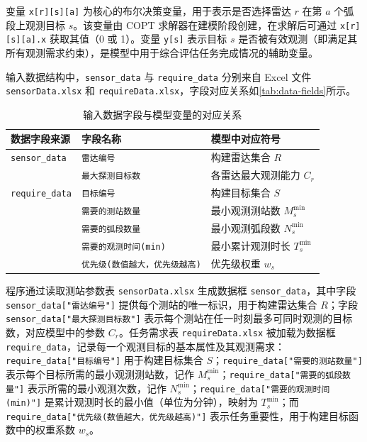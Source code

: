 \documentclass[openany,12pt,UTF8]{ctexart}
\begin{document}
变量 \texttt{x[r][s][a]} 为核心的布尔决策变量，用于表示是否选择雷达 $r$ 在第 $a$ 个弧段上观测目标 $s$。该变量由 COPT 求解器在建模阶段创建，在求解后可通过 \texttt{x[r][s][a].x} 获取其值（0 或 1）。变量 \texttt{y[s]} 表示目标 $s$ 是否被有效观测（即满足其所有观测需求约束），是模型中用于综合评估任务完成情况的辅助变量。

输入数据结构中，\texttt{sensor\_data} 与 \texttt{require\_data} 分别来自 Excel 文件 \texttt{sensorData.xlsx} 和 \texttt{requireData.xlsx}，字段对应关系如\autoref{tab:data-fields}所示。
\begin{table}[H]
    \centering
    \caption{输入数据字段与模型变量的对应关系}
    \label{tab:data-fields}
    \begin{tabular}{lll}
        \toprule
        \textbf{数据字段来源}        & \textbf{字段名称}            & \textbf{模型中对应符号}      \\
        \midrule
        \texttt{sensor\_data}  & \texttt{雷达编号}            & 构建雷达集合 $R$            \\
                               & \texttt{最大探测目标数}         & 各雷达最大观测能力 $C_r$       \\
        \addlinespace
        \texttt{require\_data} & \texttt{目标编号}            & 构建目标集合 $S$            \\
                               & \texttt{需要的测站数量}         & 最小观测测站数 $M_s^{\min}$  \\
                               & \texttt{需要的弧段数量}         & 最小观测弧段数 $N_s^{\min}$  \\
                               & \texttt{需要的观测时间(min)}    & 最小累计观测时长 $T_s^{\min}$ \\
                               & \texttt{优先级(数值越大，优先级越高)} & 优先级权重 $w_s$           \\
        \bottomrule
    \end{tabular}
\end{table}

程序通过读取测站参数表 \texttt{sensorData.xlsx} 生成数据框 \texttt{sensor\_data}，其中字段 \texttt{sensor\_data["雷达编号"]} 提供每个测站的唯一标识，用于构建雷达集合 $R$；字段 \texttt{sensor\_data["最大探测目标数"]} 表示每个测站在任一时刻最多可同时观测的目标数，对应模型中的参数 $C_r$。任务需求表 \texttt{requireData.xlsx} 被加载为数据框 \texttt{require\_data}，记录每一个观测目标的基本属性及其观测需求：\texttt{require\_data["目标编号"]} 用于构建目标集合 $S$；\texttt{require\_data["需要的测站数量"]} 表示每个目标所需的最小观测测站数，记作 $M_s^{\min}$；\texttt{require\_data["需要的弧段数量"]} 表示所需的最小观测次数，记作 $N_s^{\min}$；\texttt{require\_data["需要的观测时间(min)"]} 是累计观测时长的最小值（单位为分钟），映射为 $T_s^{\min}$；而 \texttt{require\_data["优先级(数值越大，优先级越高)"]} 表示任务重要性，用于构建目标函数中的权重系数 $w_s$。
\end{document}
